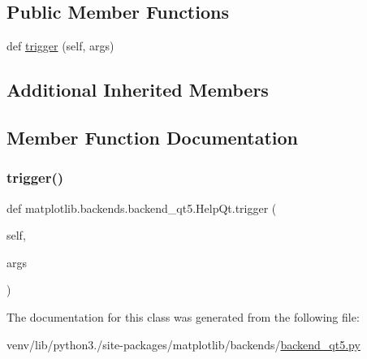 \subsection*{Public Member Functions}
\begin{DoxyCompactItemize}
\item 
def \hyperlink{classmatplotlib_1_1backends_1_1backend__qt5_1_1HelpQt_ac63f3086731ce6d02339a331acd58435}{trigger} (self, args)
\end{DoxyCompactItemize}
\subsection*{Additional Inherited Members}


\subsection{Member Function Documentation}
\mbox{\label{classmatplotlib_1_1backends_1_1backend__qt5_1_1HelpQt_ac63f3086731ce6d02339a331acd58435}} 
\subsubsection{\texorpdfstring{trigger()}{trigger()}}
{\footnotesize\ttfamily def matplotlib.\+backends.\+backend\+\_\+qt5.\+Help\+Qt.\+trigger (\begin{DoxyParamCaption}\item[{}]{self,  }\item[{}]{args }\end{DoxyParamCaption})}



The documentation for this class was generated from the following file\+:\begin{DoxyCompactItemize}
\item 
venv/lib/python3./site-\/packages/matplotlib/backends/\hyperlink{backend__qt5_8py}{backend\+\_\+qt5.\+py}\end{DoxyCompactItemize}

